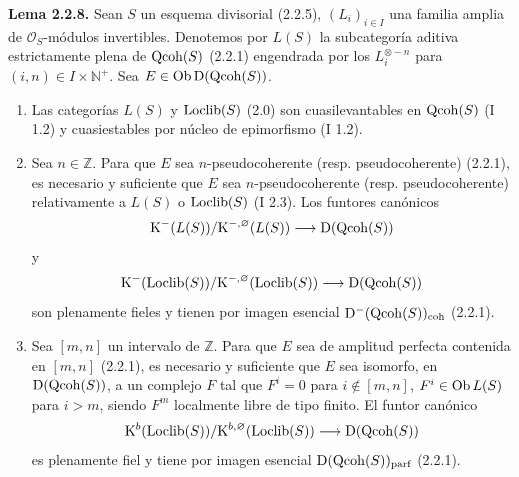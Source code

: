 \textbf{Lema 2.2.8.} Sean $S$ un esquema divisorial (2.2.5), $(L_i)_{i\in I}$ una familia amplia de $\mathcal O_S$-módulos invertibles. Denotemos por $L(S)$ la subcategoría aditiva estrictamente plena de $\operatorname{Qcoh}(S)$ (2.2.1) engendrada por los $L_i^{\otimes-n}$ para $(i,n)\in I\times\mathbb N^+$. Sea $E\in\operatorname{Ob}\mathrm D(\operatorname{Qcoh}(S))$.
\begin{enumerate}[label=\alph*)]
\item Las categorías $L(S)$ y $\operatorname{Loclib}(S)$ (2.0) son cuasilevantables en $\operatorname{Qcoh}(S)$ (I 1.2) y cuasiestables por núcleo de epimorfismo (I 1.2).
\item Sea $n\in\mathbb Z$. Para que $E$ sea $n$-pseudocoherente (resp. pseudocoherente) (2.2.1), es necesario y suficiente que $E$ sea $n$-pseudocoherente (resp. pseudocoherente) relativamente a $L(S)$ o $\operatorname{Loclib}(S)$ (I 2.3). Los funtores canónicos
\[
\mathrm K^{-}(L(S))/\mathrm K^{-,\varnothing}(L(S))\longrightarrow \mathrm D(\operatorname{Qcoh}(S))
\]
y
\[
\mathrm K^{-}(\operatorname{Loclib}(S))/\mathrm K^{-,\varnothing}(\operatorname{Loclib}(S))\longrightarrow \mathrm D(\operatorname{Qcoh}(S))
\]
son plenamente fieles y tienen por imagen esencial $\mathrm D^{-}(\operatorname{Qcoh}(S))_{\mathrm{coh}}$ (2.2.1).
\item Sea $[m,n]$ un intervalo de $\mathbb Z$. Para que $E$ sea de amplitud perfecta contenida en $[m,n]$ (2.2.1), es necesario y suficiente que $E$ sea isomorfo, en $\mathrm D(\operatorname{Qcoh}(S))$, a un complejo $F$ tal que $F^i=0$ para $i\notin[m,n]$, $F^i\in\operatorname{Ob} L(S)$ para $i>m$, siendo $F^m$ localmente libre de tipo finito. El funtor canónico
\[
\mathrm K^b(\operatorname{Loclib}(S))/\mathrm K^{b,\varnothing}(\operatorname{Loclib}(S))\longrightarrow \mathrm D(\operatorname{Qcoh}(S))
\]
es plenamente fiel y tiene por imagen esencial $\mathrm D(\operatorname{Qcoh}(S))_{\mathrm{parf}}$ (2.2.1).
\end{enumerate}

